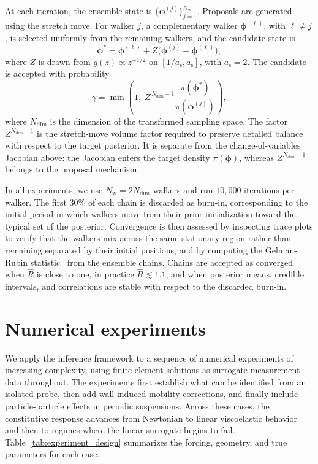 \documentclass{elsarticle}
\begin{document}
At each iteration, the ensemble state is
$\{\boldsymbol{\phi}^{(j)}\}_{j=1}^{N_{\mathrm{w}}}$. Proposals are
generated using the stretch move. For walker $j$, a complementary walker
$\boldsymbol{\phi}^{(\ell)}$, with $\ell\neq j$, is selected uniformly
from the remaining walkers, and the candidate state is
\begin{equation}
\boldsymbol{\phi}^{*}
=
\boldsymbol{\phi}^{(\ell)}
+
Z\bigl(\boldsymbol{\phi}^{(j)}-\boldsymbol{\phi}^{(\ell)}\bigr),
\label{eq:stretch_move}
\end{equation}
where $Z$ is drawn from $g(z)\propto z^{-1/2}$ on
$[1/a_{\mathrm{s}},a_{\mathrm{s}}]$, with $a_{\mathrm{s}}=2$. The
candidate is accepted with probability
\begin{equation}
\gamma
=
\min\!\left(
1,\;
Z^{\,N_{\mathrm{dim}}-1}
\frac{\pi(\boldsymbol{\phi}^{*})}
     {\pi(\boldsymbol{\phi}^{(j)})}
\right),
\label{eq:acceptance}
\end{equation}
where $N_{\mathrm{dim}}$ is the dimension of the transformed sampling
space. The factor $Z^{N_{\mathrm{dim}}-1}$ is the stretch-move volume
factor required to preserve detailed balance with respect to the target
posterior. It is separate from the change-of-variables Jacobian above:
the Jacobian enters the target density $\pi(\boldsymbol{\phi})$, whereas
$Z^{N_{\mathrm{dim}}-1}$ belongs to the proposal mechanism.

In all experiments, we use $N_{\mathrm{w}}=2N_{\mathrm{dim}}$ walkers and
run $10,000$ iterations per walker. The first $30\%$ of each chain is
discarded as burn-in, corresponding to the initial period in which
walkers move from their prior initialization toward the typical set of
the posterior. Convergence is then assessed by inspecting trace plots to
verify that the walkers mix across the same stationary region rather
than remaining separated by their initial positions, and by computing the
Gelman-Rubin statistic~\cite{gelman1992rubin,brooks1998convergence}
from the ensemble chains. Chains are accepted as converged when
$\hat{R}$ is close to one, in practice $\hat{R}\lesssim 1.1$, and when
posterior means, credible intervals, and correlations are stable with
respect to the discarded burn-in.

\section{Numerical experiments}
\label{sec:numerical_experiments}

We apply the inference framework to a sequence of numerical experiments
of increasing complexity, using finite-element solutions as surrogate
measurement data throughout. The experiments first establish what can be
identified from an isolated probe, then add wall-induced mobility
corrections, and finally include particle-particle effects in periodic
suspensions. Across these cases, the constitutive response advances from
Newtonian to linear viscoelastic behavior and then to regimes where the
linear surrogate begins to fail. Table~\ref{tab:experiment_design}
summarizes the forcing, geometry, and true parameters for each case.
\end{document}
